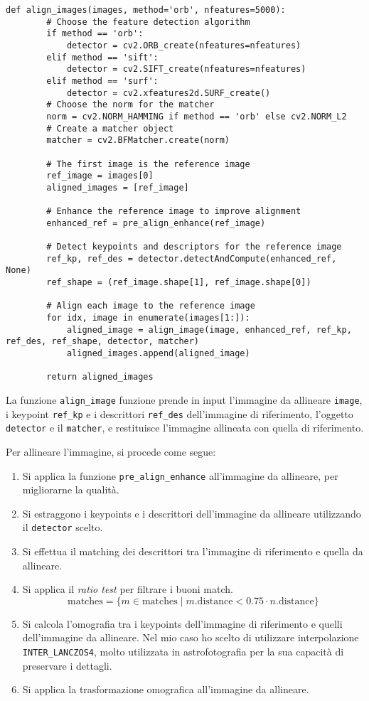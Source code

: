 \begin{lstlisting}[label={lst:alignment}]
    def align_images(images, method='orb', nfeatures=5000):
        # Choose the feature detection algorithm
        if method == 'orb':
            detector = cv2.ORB_create(nfeatures=nfeatures)
        elif method == 'sift':
            detector = cv2.SIFT_create(nfeatures=nfeatures)            
        elif method == 'surf':
            detector = cv2.xfeatures2d.SURF_create()
        # Choose the norm for the matcher
        norm = cv2.NORM_HAMMING if method == 'orb' else cv2.NORM_L2
        # Create a matcher object
        matcher = cv2.BFMatcher.create(norm)

        # The first image is the reference image
        ref_image = images[0]
        aligned_images = [ref_image]

        # Enhance the reference image to improve alignment
        enhanced_ref = pre_align_enhance(ref_image)

        # Detect keypoints and descriptors for the reference image
        ref_kp, ref_des = detector.detectAndCompute(enhanced_ref, None)
        ref_shape = (ref_image.shape[1], ref_image.shape[0])

        # Align each image to the reference image
        for idx, image in enumerate(images[1:]):
            aligned_image = align_image(image, enhanced_ref, ref_kp, ref_des, ref_shape, detector, matcher)
            aligned_images.append(aligned_image)

        return aligned_images
\end{lstlisting}

La funzione \texttt{align\_image} funzione prende in input l'immagine da allineare \texttt{image}, i keypoint \texttt{ref\_kp} e i descrittori \texttt{ref\_des} dell'immagine di riferimento, l'oggetto \texttt{detector} e il \texttt{matcher}, e restituisce l'immagine allineata con quella di riferimento.

Per allineare l'immagine, si procede come segue:

\begin{enumerate}
    \item Si applica la funzione \texttt{pre\_align\_enhance} all'immagine da allineare, per migliorarne la qualità.
    \item Si estraggono i keypoints e i descrittori dell'immagine da allineare utilizzando il \texttt{detector} scelto.
    \item Si effettua il matching dei descrittori tra l'immagine di riferimento e quella da allineare.
    \item Si applica il \textit{ratio test} per filtrare i buoni match.
    $$
    \text{matches} = \{m \in \text{matches} \mid m.\text{distance} < 0.75 \cdot n.\text{distance}\}
    $$
    \item Si calcola l'omografia tra i keypoints dell'immagine di riferimento e quelli dell'immagine da allineare. Nel mio caso ho scelto di utilizzare interpolazione \texttt{INTER\_LANCZOS4}, molto utilizzata in astrofotografia per la sua capacità di preservare i dettagli.
    \item Si applica la trasformazione omografica all'immagine da allineare.
\end{enumerate}

